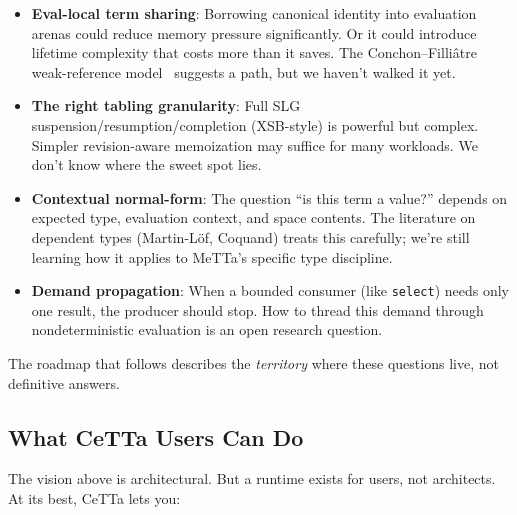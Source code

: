 \documentclass[11pt]{article}
\newcommand{\code}[1]{\texttt{#1}}
\newcommand{\CeTTa}{\textup{CeTTa}}
\newcommand{\XSB}{\textup{XSB}}
\begin{document}
\begin{itemize}
\item \textbf{Eval-local term sharing}: Borrowing canonical identity into
  evaluation arenas could reduce memory pressure significantly.  Or it
  could introduce lifetime complexity that costs more than it saves.
  The Conchon--Filliâtre weak-reference model~\cite{ConchonFilliâtre2006}
  suggests a path, but we haven't walked it yet.
\item \textbf{The right tabling granularity}: Full SLG
  suspension/resumption/completion (\XSB{}-style) is powerful but complex.
  Simpler revision-aware memoization may suffice for many workloads.  We
  don't know where the sweet spot lies.
\item \textbf{Contextual normal-form}: The question ``is this term a
  value?'' depends on expected type, evaluation context, and space contents.
  The literature on dependent types (Martin-Löf, Coquand) treats this
  carefully; we're still learning how it applies to MeTTa's specific
  type discipline.
\item \textbf{Demand propagation}: When a bounded consumer (like
  \code{select}) needs only one result, the producer should stop.
  How to thread this demand through nondeterministic evaluation is an
  open research question.
\end{itemize}

The roadmap that follows describes the \emph{territory} where these
questions live, not definitive answers.

\subsection{What CeTTa Users Can Do}

The vision above is architectural.  But a runtime exists for users, not
architects.  At its best, \CeTTa{} lets you:
\end{document}
